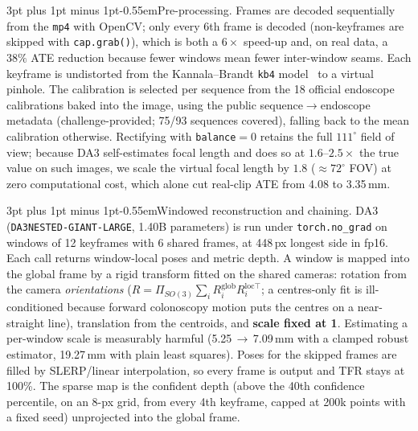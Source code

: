 \documentclass[10pt,a4paper]{article}
\makeatletter
\renewcommand\paragraph{\@startsection{paragraph}{4}{\z@}%
  {3pt plus 1pt minus 1pt}{-0.55em}{\normalfont\bfseries}}
\makeatother
\begin{document}
\paragraph{Pre-processing.}
Frames are decoded sequentially from the \texttt{mp4} with OpenCV; only every 6th frame is decoded
(non-keyframes are skipped with \texttt{cap.grab()}), which is both a $6\times$ speed-up and, on real
data, a $38\%$ ATE reduction because fewer windows mean fewer inter-window seams. Each keyframe is
undistorted from the Kannala--Brandt \texttt{kb4} model~\cite{kb} to a virtual pinhole. The
calibration is selected per sequence from the 18 official endoscope calibrations baked into the
image, using the public sequence$\to$endoscope metadata (challenge-provided; 75/93 sequences
covered), falling back to the mean calibration otherwise. Rectifying with \texttt{balance}$=0$
retains the full $111^\circ$ field of view; because DA3 self-estimates focal length and does so at
$1.6$--$2.5\times$ the true value on such images, we scale the virtual focal length by $1.8$
($\approx72^\circ$ FOV) at zero computational cost, which alone cut real-clip ATE from 4.08 to
3.35\,mm.

\paragraph{Windowed reconstruction and chaining.}
DA3 (\texttt{DA3NESTED-GIANT-LARGE}, 1.40B parameters) is run under \texttt{torch.no\_grad} on
windows of 12 keyframes with 6 shared frames, at 448\,px longest side in fp16. Each call returns
window-local poses and metric depth. A window is mapped into the global frame by a rigid transform
fitted on the shared cameras: rotation from the camera \emph{orientations}
($R=\Pi_{SO(3)}\sum_i R^{\text{glob}}_i R^{\text{loc}\top}_i$; a centres-only fit is ill-conditioned
because forward colonoscopy motion puts the centres on a near-straight line), translation from the
centroids, and \textbf{scale fixed at 1}. Estimating a per-window scale is measurably harmful
(5.25\,$\to$\,7.09\,mm with a clamped robust estimator, 19.27\,mm with plain least squares). Poses for
the skipped frames are filled by SLERP/linear interpolation, so every frame is output and TFR stays
at 100\%. The sparse map is the confident depth (above the 40th confidence percentile, on an 8-px
grid, from every 4th keyframe, capped at 200k points with a fixed seed) unprojected into the global
frame.
\end{document}
